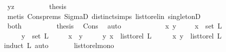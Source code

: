 \begin{isabellebody}
\ yz\isanewline
\ \ \ \ \ \ \isamarkupfalse%
\ \isamarkupfalse%
\ {\isacharquery}{\kern0pt}thesis\ \ \isanewline
\ \ \ \ \ \ \ \ \isamarkupfalse%
\ {\isacharparenleft}{\kern0pt}metis\ Cons{\isachardot}{\kern0pt}prems{\isacharparenleft}{\kern0pt}{}{\isacharparenright}{\kern0pt}\ SigmaD{}\ distinct{\isachardot}{\kern0pt}simps{\isacharparenleft}{\kern0pt}{}{\isacharparenright}{\kern0pt}\ list{\isacharunderscore}{\kern0pt}to{\isacharunderscore}{\kern0pt}rel{\isacharunderscore}{\kern0pt}in\ singletonD{\isacharparenright}{\kern0pt}\ \isanewline
\ \ \ \ \isamarkupfalse%
\isanewline
\ \ \ \ \ \ \isamarkupfalse%
\ both\isanewline
\ \ \ \ \ \ \isamarkupfalse%
\ \isamarkupfalse%
\ {\isacharquery}{\kern0pt}thesis\ \isamarkupfalse%
\ Cons\ \isamarkupfalse%
\ auto\ \isanewline
\ \ \ \ \isamarkupfalse%
\isanewline
\ \ \isamarkupfalse%
\isanewline
{}\isamarkupfalse%
\isanewline
\ \ \isamarkupfalse%
\ x\ y\ \isanewline
\ \ \isamarkupfalse%
\ {\isachardoublequoteopen}x\ {\isasymin}\ set\ L{\isachardoublequoteclose}\isanewline
\ \ \ \ \ {\isachardoublequoteopen}y\ {\isasymin}\ set\ L{\isachardoublequoteclose}\isanewline
\ \ \ \ \ {\isachardoublequoteopen}x\ {\isasymnoteq}\ y{\isachardoublequoteclose}\isanewline
\ \ \ \ \ {\isachardoublequoteopen}{\isacharparenleft}{\kern0pt}y{\isacharcomma}{\kern0pt}\ x{\isacharparenright}{\kern0pt}\ {\isasymnotin}\ list{\isacharunderscore}{\kern0pt}to{\isacharunderscore}{\kern0pt}rel\ L{\isachardoublequoteclose}\isanewline
\ \ \isamarkupfalse%
\ \isamarkupfalse%
\ {\isachardoublequoteopen}{\isacharparenleft}{\kern0pt}x{\isacharcomma}{\kern0pt}\ y{\isacharparenright}{\kern0pt}\ {\isasymin}\ list{\isacharunderscore}{\kern0pt}to{\isacharunderscore}{\kern0pt}rel\ L{\isachardoublequoteclose}\isanewline
\ \ \isamarkupfalse%
{\isacharparenleft}{\kern0pt}induct\ L{\isacharcomma}{\kern0pt}\ auto{\isacharparenright}{\kern0pt}\ \isamarkupfalse%
\ \ \ \ \isanewline
{}\isamarkupfalse%
%
\endisatagproof
{\isafoldproof}%
%
\isadelimproof
\isanewline
%
\endisadelimproof
\isanewline
\isanewline
{}\isamarkupfalse%
\ list{\isacharunderscore}{\kern0pt}to{\isacharunderscore}{\kern0pt}rel{\isacharunderscore}{\kern0pt}mono{\isacharcolon}{\kern0pt}\isanewline

\end{isabellebody}
